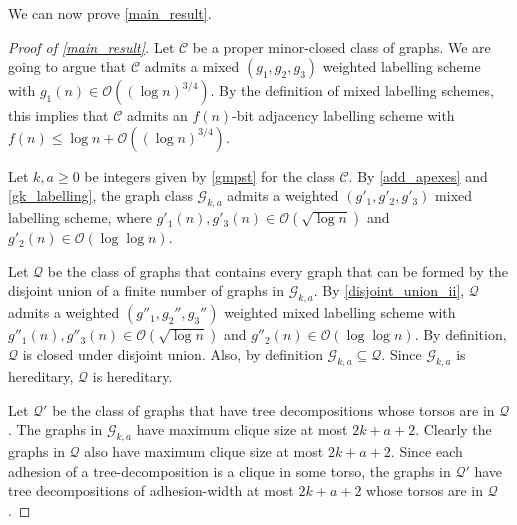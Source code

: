 \documentclass{patmorin}
\renewcommand{\ge}{\geqslant}
\renewcommand{\le}{\leqslant}
\renewcommand{\geq}{\geqslant}
\newcommand{\Oh}{\mathcal{O}}
\begin{document}


  We can now prove \cref{main_result}.

  \begin{proof}[Proof of \cref{main_result}]
     Let $\mathcal{C}$ be a proper minor-closed class of graphs.
     We are going to argue that $\mathcal{C}$ admits a mixed $(g_1,g_2,g_3)$ weighted labelling scheme with $g_1(n) \in \Oh((\log n)^{3/4})$. By the definition of mixed labelling schemes, this implies that $\mathcal{C}$ admits an $f(n)$-bit adjacency labelling scheme with $f(n)\le\log n + \Oh((\log n)^{3/4})$.

     Let $k,a\geq 0$ be integers given by \cref{gmpst} for the class $\mathcal{C}$.
     By \cref{add_apexes} and \cref{gk_labelling}, the graph class $\mathcal{G}_{k,a}$ admits a weighted $(g'_1,g'_2,g'_3)$ mixed labelling scheme, where $g'_1(n),g'_3(n)\in \Oh(\sqrt{\log n})$ and $g'_2(n)\in \Oh(\log\log n)$.

     Let $\mathcal{Q}$ be the class of graphs that contains every graph that can be formed by the disjoint union of a finite number of graphs in $\mathcal{G}_{k,a}$.  By \cref{disjoint_union_ii}, $\mathcal{Q}$ admits a weighted $(g''_1,g_2'',g_3'')$ weighted mixed labelling scheme with $g''_1(n),g''_3(n)\in \Oh(\sqrt{\log n})$ and $g''_2(n)\in \Oh(\log\log n)$.   By definition, $\mathcal{Q}$ is closed under disjoint union.  Also, by definition $\mathcal{G}_{k,a}\subseteq\mathcal{Q}$. Since $\mathcal{G}_{k,a}$ is hereditary, $\mathcal{Q}$ is hereditary.

     Let $\mathcal{Q}'$ be the class of graphs that have tree decompositions whose torsos are in $\mathcal{Q}$.  The graphs in $\mathcal{G}_{k,a}$ have maximum clique size at most $2k+a+2$.  Clearly the graphs in $\mathcal{Q}$ also have maximum clique size at most $2k+a+2$. Since each adhesion of a tree-decomposition is a clique in some torso, the graphs in $\mathcal{Q}'$ have tree decompositions of adhesion-width at most $2k+a+2$ whose torsos are in $\mathcal{Q}$.


\end{proof}
\end{document}
